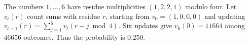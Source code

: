 The numbers $1,\ldots,6$ have residue multiplicities $(1,2,2,1)$ modulo four. Let $v_t(r)$ count sums with residue $r$, starting from $v_0=(1,0,0,0)$ and updating $v_{t+1}(r)=\sum_{j=1}^6v_t(r-j\bmod4)$. Six updates give $v_6(0)=11664$ among $46656$ outcomes. Thus the probability is $\boxed{0.250}$.
